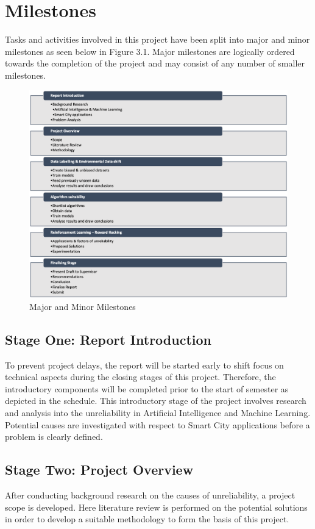 \documentclass[a4paper,12pt]{report}
\begin{document}
\newpage
\section{Milestones}
Tasks and activities involved in this project have been split into major and minor milestones as seen below in Figure 3.1. 
Major milestones are logically ordered towards the completion of the project and may consist of any number of smaller milestones. 

\begin{figure}[h]
    \centering
    \hspace*{-1.5cm}  
    \includegraphics[width=1.2\textwidth]{milestones.png}
    \caption{Major and Minor Milestones}
    \label{fig:milestones}
\end{figure}

\subsection{Stage One: Report Introduction}
To prevent project delays, the report will be started early to shift focus on technical aspects during the closing stages of this project. 
Therefore, the introductory components will be completed prior to the start of semester as depicted in the schedule.
This introductory stage of the project involves research and analysis into the unreliability in Artificial Intelligence and Machine Learning. 
Potential causes are investigated with respect to Smart City applications before a problem is clearly defined.

\subsection{Stage Two: Project Overview}
After conducting background research on the causes of unreliability, a project scope is developed. Here literature review is performed
on the potential solutions in order to develop a suitable methodology to form the basis of this project.
\end{document}
